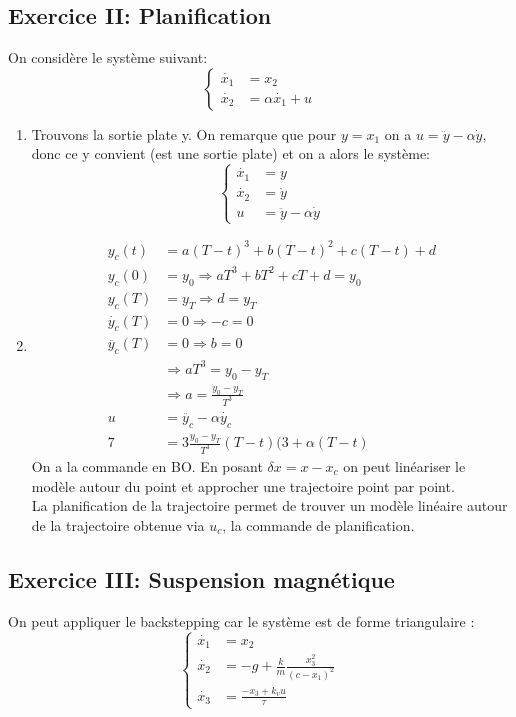 \documentclass{../../td}{subfiles}
\begin{document}
\subsection*{Exercice II: Planification}
On considère le système suivant:
\[
  \begin{cases}
\dot{x_1} &= x_2\\
\dot{x_2} &= \alpha\dot{x_1} + u
\end{cases}
\]
\begin{enumerate}
\item Trouvons la sortie plate y. On remarque que pour $y=x_1$ on a $u = \ddot{y} - \alpha \dot{y}$, donc ce y convient (est une sortie plate) et on a alors le système:
\[ \left\{\begin{matrix}
\dot{x_1} &= y\\
\dot{x_2} &= \dot{y}\\
u &= \ddot{y} - \alpha \dot{y}
\end{matrix}\right. \]

\item 
\begin{align*}
y_c(t) &= a(T-t)^3 + b(T-t)^2 + c(T-t) + d\\
y_c(0) &= y_0 \Rightarrow aT^3 + bT^2 + cT + d = y_0\\
y_c(T) &= y_T \Rightarrow d = y_T\\
\dot{y_c}(T) &= 0 \Rightarrow -c = 0\\
\ddot{y_c}(T) &= 0 \Rightarrow b = 0\\
&\Rightarrow aT^3 = y_0 - y_T\\
&\Rightarrow a = \frac{y_0 - y_T}{T^3}\\
u &= \ddot{y_c} - \alpha \dot{y_c}\\7
&=3\frac{y_0 -y_T}{T^3}(T-t)(3 + \alpha(T-t)
\end{align*}
On a la commande en BO. En posant $ \delta x = x - x_c$ on peut linéariser le modèle autour du point et approcher une trajectoire point par point.\\
La planification de la trajectoire permet de trouver un modèle linéaire autour de la trajectoire obtenue via $u_c$, la commande de planification.

\end{enumerate}

\subsection*{Exercice III: Suspension magnétique}
On peut appliquer le backstepping car le système est de forme triangulaire :
\[ \left\{ \begin{matrix}
\dot{x_1} &= x_2\\
\dot{x_2} &= -g + \frac{k}{m} \frac{x_3^2}{(c-x_1)^2}\\
\dot{x_3} &= \frac{-x_3 + k_v u}{\tau}
\end{matrix} \right. \]
\end{document}
